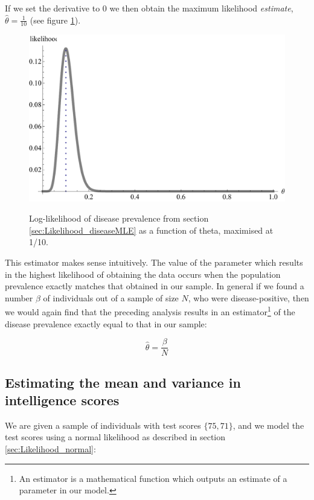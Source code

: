 \documentclass[11pt,fullpage]{book}
\begin{document}
If we set the derivative to 0 we then obtain the maximum likelihood \textit{estimate}, $\hat{\theta} = \frac{1}{10}$ (see figure \ref{fig:Likelihood_MLE}).

\begin{figure}
\centering
\scalebox{0.75} 
{\includegraphics{Likelihood_ML.pdf}}
\caption{Log-likelihood of disease prevalence from section \ref{sec:Likelihood_diseaseMLE} as a function of theta, maximised at 1/10.}\label{fig:Likelihood_MLE}
\end{figure}


This estimator makes sense intuitively. The value of the parameter which results in the highest likelihood of obtaining the data occurs when the population prevalence exactly matches that obtained in our sample. In general if we found a number $\beta$ of individuals out of a sample of size $N$, who were disease-positive, then we would again find that the preceding analysis results in an estimator\footnote{An estimator is a mathematical function which outputs an estimate of a parameter in our model.} of the disease prevalence exactly equal to that in our sample:

\begin{equation}\label{eq:Likelihood_binomialestimator}
\hat{\theta} = \frac{\beta}{N}
\end{equation}

\subsection{Estimating the mean and variance in intelligence scores}
We are given a sample of individuals with test scores $\{75,71\}$, and we model the test scores using a normal likelihood as described in section \ref{sec:Likelihood_normal}:
\end{document}

